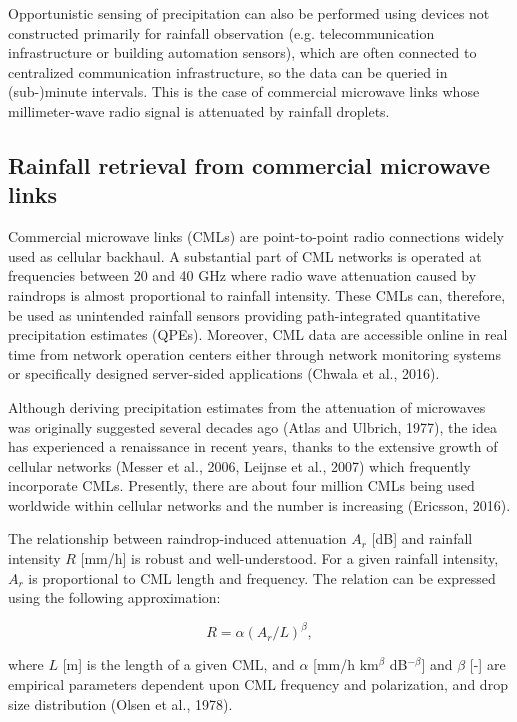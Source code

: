 \documentclass{ctuthesis}\usepackage[]{graphicx}\usepackage[]{color}
\begin{document}
Opportunistic sensing of precipitation can also be performed using devices not constructed primarily for rainfall observation (e.g. telecommunication infrastructure or building automation sensors), which are often connected to centralized communication infrastructure, so the data can be queried in (sub-)minute intervals. This is the case of commercial microwave links whose millimeter-wave radio signal is attenuated by rainfall droplets.

\subsection{Rainfall retrieval from commercial microwave links}

Commercial microwave links (CMLs) are point-to-point radio connections widely used as cellular backhaul. A substantial part of CML networks is operated at frequencies between 20 and 40 GHz where radio wave attenuation caused by raindrops is almost proportional to rainfall intensity. These CMLs can, therefore, be used as unintended rainfall sensors providing path-integrated quantitative precipitation estimates (QPEs). Moreover, CML data are accessible online in real time from network operation centers either through network monitoring systems or specifically designed server-sided applications (Chwala et al., 2016).

Although deriving precipitation estimates from the attenuation of microwaves was originally suggested several decades ago (Atlas and Ulbrich, 1977), the idea has experienced a renaissance in recent years, thanks to the extensive growth of cellular networks (Messer et al., 2006, Leijnse et al., 2007) which frequently incorporate CMLs. Presently, there are about four million CMLs being used worldwide within cellular networks and the number is increasing (Ericsson, 2016).

The relationship between raindrop-induced attenuation $A_r$ [dB] and rainfall intensity $R$ [mm/h] is robust and well-understood. For a given rainfall intensity, $A_r$ is proportional to CML length and frequency. The relation can be expressed using the following approximation: 

\begin{equation} \label{2eq1}
R = \alpha (A_r / L)^\beta,
\end{equation}


where $L$ [m] is the length of a given CML, and $\alpha$ [mm/h km$^\beta$ dB$^{-\beta}$] and $\beta$ [-] are empirical parameters dependent upon CML frequency and polarization, and drop size distribution (Olsen et al., 1978).
\end{document}
